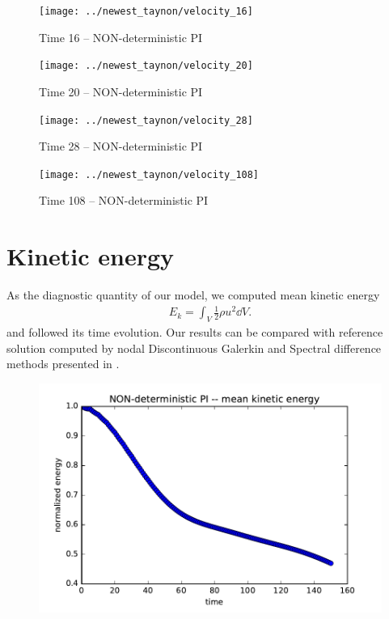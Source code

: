 \begin{figure}[H]
 \centering 
 \texttt{[image: ../newest\_taynon/velocity\_16]}
 \label{transitions}
 \caption{Time 16 -- NON-deterministic PI}
\end{figure}

\begin{figure}[H]
 \centering 
 \texttt{[image: ../newest\_taynon/velocity\_20]}
 \label{transitions}
 \caption{Time 20 -- NON-deterministic PI}
\end{figure}


\begin{figure}[H]
 \centering 
 \texttt{[image: ../newest\_taynon/velocity\_28]}
 \label{transitions}
 \caption{Time 28 -- NON-deterministic PI}
\end{figure}


\begin{figure}[H]
 \centering 
 \texttt{[image: ../newest\_taynon/velocity\_108]}
 \label{transitions}
 \caption{Time 108 -- NON-deterministic PI}
\end{figure}

\section{Kinetic energy}
As the diagnostic quantity of our model, we computed mean kinetic energy 
\begin{align*}
E_k = \int_V \frac{1}{2}\rho u^2 \dd V.	
\end{align*}
and followed its time evolution.
Our results can be compared with reference solution computed by nodal Discontinuous Galerkin and Spectral difference methods presented in \cite{tgvref}.

\begin{figure}[H]
 \centering 
 \includegraphics[width=1\textwidth]{./img/tgv_none}
\end{figure}

